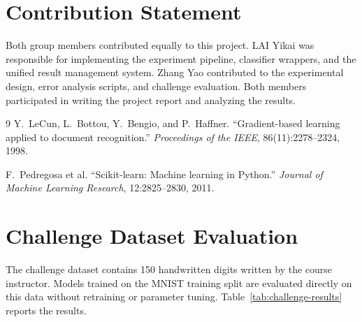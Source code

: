 \documentclass[11pt,a4paper,twocolumn]{article}
\begin{document}
\section*{Contribution Statement}

Both group members contributed equally to this project. LAI Yikai was responsible for implementing the experiment pipeline, classifier wrappers, and the unified result management system. Zhang Yao contributed to the experimental design, error analysis scripts, and challenge evaluation. Both members participated in writing the project report and analyzing the results.

\begin{thebibliography}{9}
Y.~LeCun, L.~Bottou, Y.~Bengio, and P.~Haffner.
``Gradient-based learning applied to document recognition.''
\textit{Proceedings of the IEEE}, 86(11):2278--2324, 1998.

F.~Pedregosa et al.
``Scikit-learn: Machine learning in Python.''
\textit{Journal of Machine Learning Research}, 12:2825--2830, 2011.
\end{thebibliography}

\clearpage

\appendix

\section{Challenge Dataset Evaluation}
\label{app:challenge}

The challenge dataset contains 150 handwritten digits written by the course instructor. Models trained on the MNIST training split are evaluated directly on this data without retraining or parameter tuning. Table~\ref{tab:challenge-results} reports the results.
\end{document}
